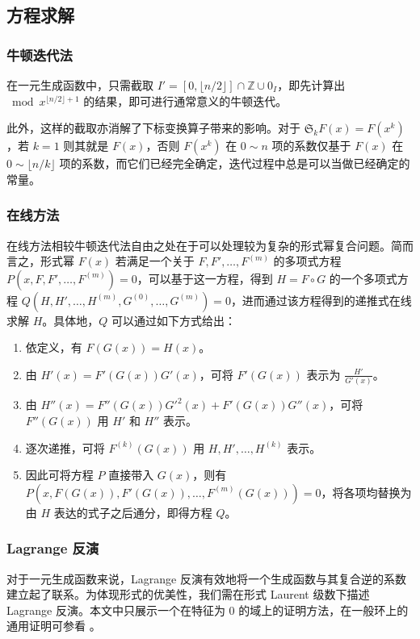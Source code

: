 \subsection{方程求解}

\subsubsection{牛顿迭代法}

在一元生成函数中，只需截取 $I' = [0, \lfloor n/2\rfloor] \cap \mathbb Z \cup 0_I$，即先计算出 $\bmod x^{\lfloor n/2\rfloor+1}$ 的结果，即可进行通常意义的牛顿迭代。

此外，这样的截取亦消解了下标变换算子带来的影响。对于 $\mathfrak S_k F(x) = F(x^k)$，若 $k=1$ 则其就是 $F(x)$，否则 $F(x^k)$ 在 $0\sim n$ 项的系数仅基于 $F(x)$ 在 $0 \sim \lfloor n/k\rfloor$ 项的系数，而它们已经完全确定，迭代过程中总是可以当做已经确定的常量。

\subsubsection{在线方法}

在线方法相较牛顿迭代法自由之处在于可以处理较为复杂的形式幂复合问题。简而言之，形式幂 $F(x)$ 若满足一个关于 $F,F',\dots,F^{(m)}$ 的多项式方程 $P(x,F,F',\dots,F^{(m)})=0$，可以基于这一方程，得到 $H=F\circ G$ 的一个多项式方程 $Q(H,H',\dots,H^{(m)},G^{(0)},\dots,G^{(m)})=0$，进而通过该方程得到的递推式在线求解 $H$。具体地，$Q$ 可以通过如下方式给出：
\begin{enumerate}
\item 依定义，有 $F(G(x)) = H(x)$。
\item 由 $H'(x) = F'(G(x))G'(x)$，可将 $F'(G(x))$ 表示为 $\frac{H'}{G'(x)}$。
\item 由 $H''(x) = F''(G(x))G'^2(x) + F'(G(x))G''(x)$，可将 $F''(G(x))$ 用 $H'$ 和 $H''$ 表示。
\item 逐次递推，可将 $F^{(k)}(G(x))$ 用 $H,H',\dots,H^{(k)}$ 表示。
\item 因此可将方程 $P$ 直接带入 $G(x)$，则有 $P(x,F(G(x)),F'(G(x)),\dots,F^{(m)}(G(x))) = 0$，将各项均替换为由 $H$ 表达的式子之后通分，即得方程 $Q$。
\end{enumerate}

\subsubsection{Lagrange 反演}

对于一元生成函数来说，Lagrange 反演有效地将一个生成函数与其复合逆的系数建立起了联系。为体现形式的优美性，我们需在形式 Laurent 级数下描述 Lagrange 反演。本文中只展示一个在特征为 $0$ 的域上的证明方法，在一般环上的通用证明可参看 \cite[Sec. 1.2]{combenum}。

